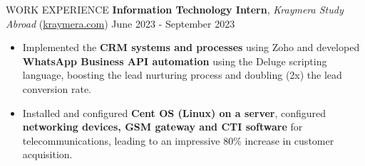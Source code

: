 \documentclass{resume} %
\begin{document}
\begin{rSection}{WORK EXPERIENCE}
    \textbf{Information Technology Intern}, \textit{Kraymera Study Abroad} (\href{https://kraymera.com}{kraymera.com})  \hfill June 2023 - September 2023

    \begin{itemize}
        \itemsep -6pt {}
        \item Implemented the \textbf{CRM systems and processes} using Zoho and developed \textbf{WhatsApp Business API automation} using the Deluge scripting language, boosting the lead nurturing process and doubling (2x) the lead conversion rate.
        \item Installed and configured \textbf{Cent OS (Linux) on a server}, configured \textbf{networking devices, GSM gateway and CTI software} for telecommunications, leading to an impressive 80\% increase in customer acquisition.
    \end{itemize}
\end{rSection}



\end{document}
